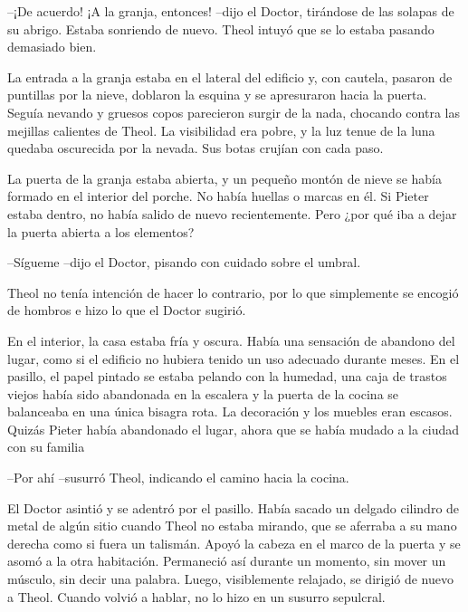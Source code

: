 --¡De acuerdo! ¡A la granja, entonces! --dijo el Doctor, tirándose de las solapas de su abrigo. Estaba sonriendo de nuevo. Theol intuyó que se lo estaba pasando demasiado bien.



La entrada a la granja estaba en el lateral del edificio y, con cautela, pasaron de puntillas por la nieve, doblaron la esquina y se apresuraron hacia la puerta. Seguía nevando y gruesos copos parecieron surgir de la nada, chocando contra las mejillas calientes de Theol. La visibilidad era pobre, y la luz tenue de la luna quedaba oscurecida por la nevada. Sus botas crujían con cada paso.



La puerta de la granja estaba abierta, y un pequeño montón de nieve se había formado en el interior del porche. No había huellas o marcas en él. Si Pieter estaba dentro, no había salido de nuevo recientemente. Pero ¿por qué iba a dejar la puerta abierta a los elementos?



--Sígueme --dijo el Doctor, pisando con cuidado sobre el umbral.



Theol no tenía intención de hacer lo contrario, por lo que simplemente se encogió de hombros e hizo lo que el Doctor sugirió.



En el interior, la casa estaba fría y oscura. Había una sensación de abandono del lugar, como si el edificio no hubiera tenido un uso adecuado durante meses. En el pasillo, el papel pintado se estaba pelando con la humedad, una caja de trastos viejos había sido abandonada en la escalera y la puerta de la cocina se balanceaba en una única bisagra rota. La decoración y los muebles eran escasos. Quizás Pieter había abandonado el lugar, ahora que se había mudado a la ciudad con su familia



--Por ahí --susurró Theol, indicando el camino hacia la cocina.



El Doctor asintió y se adentró por el pasillo. Había sacado un delgado cilindro de metal de algún sitio cuando Theol no estaba mirando, que se aferraba a su mano derecha como si fuera un talismán. Apoyó la cabeza en el marco de la puerta y se asomó a la otra habitación. Permaneció así durante un momento, sin mover un músculo, sin decir una palabra. Luego, visiblemente relajado, se dirigió de nuevo a Theol. Cuando volvió a hablar, no lo hizo en un susurro sepulcral.

